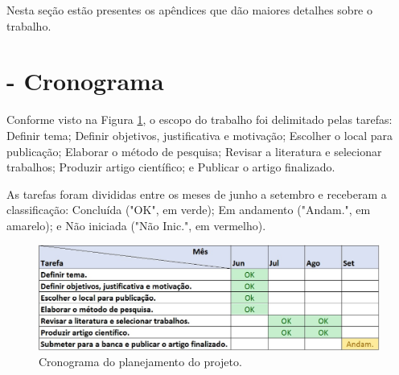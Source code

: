 \documentclass[smallextended]{svjour3}
\begin{document}
	\begin{appendices}
		
		Nesta seção estão presentes os apêndices que dão maiores detalhes sobre o trabalho.
		
		\section{- Cronograma}
			Conforme visto na Figura \ref{fig:cronograma}, o escopo do trabalho foi delimitado pelas tarefas: Definir tema; Definir objetivos, justificativa e motivação; Escolher o local para publicação; Elaborar o método de pesquisa; Revisar a literatura e selecionar trabalhos; Produzir artigo científico; e Publicar o artigo finalizado. 
			
			As tarefas foram divididas entre os meses de junho a setembro e receberam a classificação: Concluída ("OK", em verde); Em andamento ("Andam.", em amarelo); e Não iniciada ("Não Inic.", em vermelho). 
			
			\begin{figure}[!ht]
				\centering
				\includegraphics[width=1\textwidth]{imagens/cronogramaFINAL.jpg}
				\caption{Cronograma do planejamento do projeto.}
				\label{fig:cronograma}
			\end{figure}
	\end{appendices}
	
\end{document}
